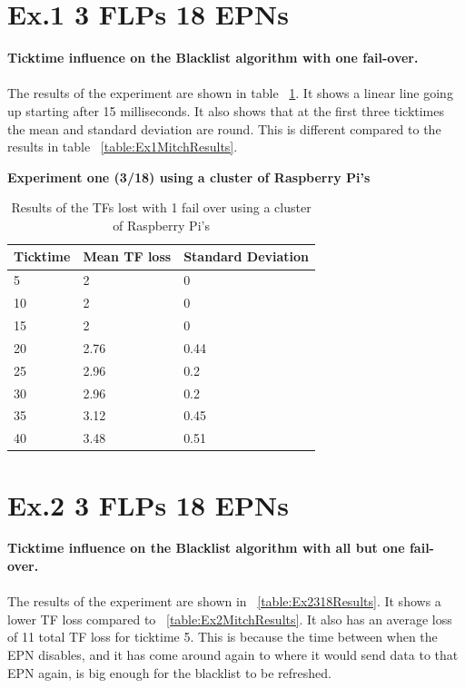 \newpage

\section{Ex.1 3 FLPs 18 EPNs}
\textbf{Ticktime influence on the Blacklist algorithm with one fail-over.}
\\~\\
The results of the experiment are shown in table ~\ref{table:Ex1318Results}. It shows a linear line going up starting after 15 milliseconds. It also shows that at the first three ticktimes the mean and standard deviation are round. This is different compared to the results in table ~\ref{table:Ex1MitchResults}.

\begin{table}[h!]
\caption*{\textbf{Experiment one (3/18) using a cluster of Raspberry Pi's}}
\begin{tabular}{| l | l | l |}
\hline
Ticktime & Mean TF loss & Standard Deviation \\ \hline
5 & 2 & 0 \\ \hline
10 & 2 & 0 \\ \hline
15 & 2 & 0 \\ \hline
20 & 2.76 & 0.44 \\ \hline
25 & 2.96 & 0.2 \\ \hline
30 & 2.96 & 0.2 \\ \hline
35 & 3.12 & 0.45 \\ \hline
40 & 3.48 & 0.51 \\ \hline
\end{tabular}
\caption{Results of the TFs lost with 1 fail over using a cluster of Raspberry Pi's}
\label{table:Ex1318Results}
\end{table}

\newpage

\section{Ex.2 3 FLPs 18 EPNs}
\textbf{Ticktime influence on the Blacklist algorithm with all but one fail-over.}
\\~\\
The results of the experiment are shown in ~\ref{table:Ex2318Results}. It shows a lower TF loss compared to ~\ref{table:Ex2MitchResults}. It also has an average loss of 11 total TF loss for ticktime 5. This is because the time between when the EPN disables, and it has come around again to where it would send data to that EPN again, is big enough for the blacklist to be refreshed.

